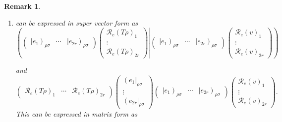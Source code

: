\documentclass[aps,preprint]{revtex4}
\newtheorem{remark}[theorem]{Remark}
\begin{document}
\begin{remark}
\begin{enumerate}
\begin{enumerate}
\item can be expressed in super vector form as 
\begin{equation}
\left( \left. \left( 
\begin{array}{ccc}
\left\vert e_{1}\right) _{\rho \sigma } & \cdots & \left\vert e_{2r}\right)
_{\rho \sigma }%
\end{array}%
\right) \left( 
\begin{array}{c}
\mathcal{R}_{e}\left( T\rho \right) _{1} \\ 
\vdots \\ 
\mathcal{R}_{e}\left( T\rho \right) _{2r}%
\end{array}%
\right) \right\vert \left( 
\begin{array}{ccc}
\left\vert e_{1}\right) _{\rho \sigma } & \cdots & \left\vert e_{2r}\right)
_{\rho \sigma }%
\end{array}%
\right) \left( 
\begin{array}{c}
\mathcal{R}_{e}\left( v\right) _{1} \\ 
\vdots \\ 
\mathcal{R}_{e}\left( v\right) _{2r}%
\end{array}%
\right) \right)
\end{equation}

and 
\begin{equation}
\left( 
\begin{array}{ccc}
\mathcal{R}_{e}\left( T\rho \right) _{1} & \cdots & \mathcal{R}_{e}\left(
T\rho \right) _{2r}%
\end{array}%
\right) \left( 
\begin{array}{c}
\left( e_{1}\right\vert _{\rho \sigma } \\ 
\vdots \\ 
\left( e_{2r}\right\vert _{\rho \sigma }%
\end{array}%
\right) \left( 
\begin{array}{ccc}
\left\vert e_{1}\right) _{\rho \sigma } & \cdots & \left\vert e_{2r}\right)
_{\rho \sigma }%
\end{array}%
\right) \left( 
\begin{array}{c}
\mathcal{R}_{e}\left( v\right) _{1} \\ 
\vdots \\ 
\mathcal{R}_{e}\left( v\right) _{2r}%
\end{array}%
\right) .
\end{equation}%
This can be expressed in matrix form as


\end{enumerate}
\end{enumerate}
\end{remark}
\end{document}
